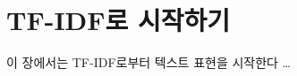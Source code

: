 \documentclass[11pt]{book}
\begin{document}
\drawcover\clearpage

\renewcommand{\hfTitleLineOne}{텍스트 분석을 위한}
\renewcommand{\hfTitleLineTwo}{Hugging Face 입문}
\renewcommand{\hfSubtitle}{손으로 따라가며 익히는 텍스트 분류 · 20챕터}
\renewcommand{\hfAuthor}{황윤구}


\frontmatter
\tableofcontents

\mainmatter
\chapter{TF-IDF로 시작하기}
이 장에서는 TF-IDF로부터 텍스트 표현을 시작한다 …
\end{document}
